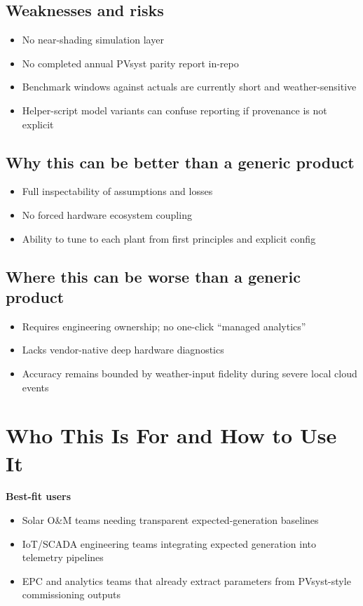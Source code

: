 \documentclass[11pt,a4paper]{article}
\begin{document}
\subsection{Weaknesses and risks}
\begin{itemize}
  \item No near-shading simulation layer
  \item No completed annual PVsyst parity report in-repo
  \item Benchmark windows against actuals are currently short and weather-sensitive
  \item Helper-script model variants can confuse reporting if provenance is not explicit
\end{itemize}

\subsection{Why this can be better than a generic product}
\begin{itemize}
  \item Full inspectability of assumptions and losses
  \item No forced hardware ecosystem coupling
  \item Ability to tune to each plant from first principles and explicit config
\end{itemize}

\subsection{Where this can be worse than a generic product}
\begin{itemize}
  \item Requires engineering ownership; no one-click ``managed analytics''
  \item Lacks vendor-native deep hardware diagnostics
  \item Accuracy remains bounded by weather-input fidelity during severe local cloud events
\end{itemize}

\section{Who This Is For and How to Use It}

\textbf{Best-fit users}
\begin{itemize}
  \item Solar O\&M teams needing transparent expected-generation baselines
  \item IoT/SCADA engineering teams integrating expected generation into telemetry pipelines
  \item EPC and analytics teams that already extract parameters from PVsyst-style commissioning outputs
\end{itemize}
\end{document}
